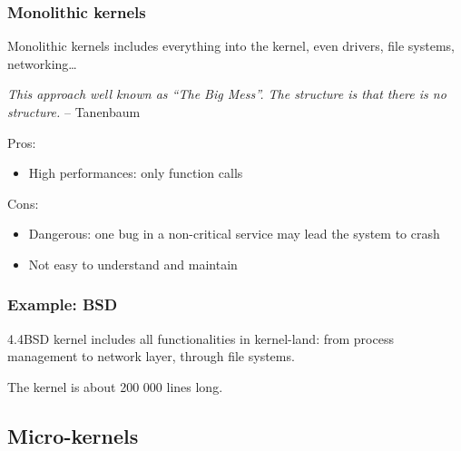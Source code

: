 \begin{frame}
  \frametitle{Monolithic kernels}

  Monolithic kernels includes everything into the kernel, even drivers, file systems, networking\ldots

  \-

  \emph{This approach well known as ``The Big Mess''. The structure is that there is no structure.} -- Tanenbaum

  \-

  Pros:

  \begin{itemize}
  \item
    High performances: only function calls
  \end{itemize}

  \-

  Cons:

  \begin{itemize}
  \item
    Dangerous: one bug in a non-critical service may lead the system
    to crash
  \item
    Not easy to understand and maintain
  \end{itemize}

\end{frame}

%
%

\begin{frame}
  \frametitle{Example: BSD}

  4.4BSD kernel includes all functionalities in kernel-land: from process management to network layer, through file systems.

  \begin{center}
  \end{center}

  The kernel is about 200 000 lines long.

\end{frame} 

%
%

\subsection{Micro-kernels}

%
%

